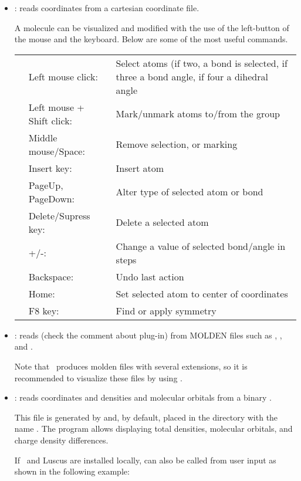 \begin{itemize}
\item {}: reads coordinates from a cartesian coordinate file.

A molecule can be visualized and modified with the use of the
left-button of the mouse and the keyboard. Below are some of the most
useful commands.

\begin{tabular}{p{0.2cm} p{4cm} p{8.0cm}}
 & Left mouse click: & Select atoms (if two, a bond is selected, if three
                       a bond angle, if four a dihedral angle\\
 & Left mouse + Shift click: & Mark/unmark atoms to/from the group\\
 & Middle mouse/Space:& Remove selection, or marking\\
 & Insert key:        & Insert atom\\
 & PageUp, PageDown:  & Alter type of selected atom or bond\\
 & Delete/Supress key:& Delete a selected atom\\
 & +/-:               & Change a value of selected bond/angle in steps\\
 & Backspace:         & Undo last action\\
 & Home:              & Set selected atom to center of coordinates\\
 & F8 key:            & Find or apply symmetry\\
\end{tabular}

\item {}: reads (check the comment about plug-in)  from MOLDEN files such as
, , and .

Note that \molcas\ produces molden files with several extensions, so it is
recommended to visualize these files by using .


\item {}: reads coordinates and densities and molecular orbitals from
a binary .

This file is generated by  and, by default, placed in the  directory with the name
. The program allows displaying total densities, molecular orbitals, and charge density differences.

If \molcas\ and Luscus are installed locally,  can also be called from user input as shown in the following example:


\end{itemize}
